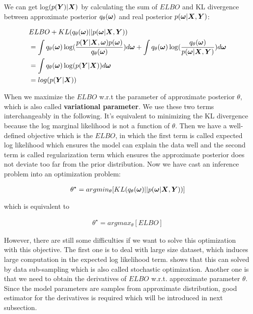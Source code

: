 We can get log$(p(\boldsymbol Y) | \boldsymbol X)$ by calculating the sum of $ELBO$ and KL divergence between approximate posterior $q_{\theta}(\boldsymbol \omega)$ and real posterior $p(\boldsymbol \omega | \boldsymbol X, \boldsymbol Y)$:

\begin{equation}\label{2.7}	
\begin{aligned}
 & ELBO + KL(q_{\theta}(\boldsymbol{\omega}) || p(\boldsymbol{\omega}|\boldsymbol{X}, \boldsymbol{Y})) \\ 
 & = \int q_{\theta}(\boldsymbol{\omega}) \log( \frac{p(\boldsymbol{Y}| \boldsymbol{X}, \boldsymbol{\omega}) p(\boldsymbol{\omega})}{q_{\theta}(\boldsymbol{\omega})}) d\boldsymbol{\omega} + \int q_{\theta}(\boldsymbol{\omega}) \log(\frac{q_{\theta}(\boldsymbol{\omega})}{p(\boldsymbol{\omega}|\boldsymbol{X}, \boldsymbol{Y})}) d\boldsymbol{\omega} \\
 & = \int q_{\theta}(\boldsymbol{\omega}) \log(p(\boldsymbol{Y} | \boldsymbol{X}))d\boldsymbol{\omega}\\
 & = log(p(\boldsymbol{Y}|\boldsymbol{X})) 
\end{aligned}
\end{equation}

When we maximize the $ELBO$ w.r.t the parameter of approximate posterior $\theta$, which is also called \textbf{variational parameter}. We use these two terms interchangeably in the following. It's equivalent to minimizing the KL divergence because the log marginal likelihood is not a function of $\theta$. Then we have a well-defined objective which is the $ELBO$, in which the first term is called expected log likelihood which ensures the model can explain the data well and the second term is called regularization term which ensures the approximate posterior does not deviate too far from the prior distribution.
Now we have cast an inference problem into an optimization problem:

\begin{equation}\label{2.8}	
\begin{aligned}
\theta^{\star} = argmin_{\theta} [KL(q_{\theta}(\boldsymbol \omega)||p(\boldsymbol \omega | \boldsymbol X, \boldsymbol Y))]
\end{aligned}
\end{equation}

which is equivalent to 

\begin{equation}\label{2.9}	
\begin{aligned}
\theta^{\star} = argmax_{\theta} [ELBO]
\end{aligned}
\end{equation}

However, there are still some difficulties if we want to solve this optimization with this objective. The first one is to deal with large size dataset, which induces large computation in the expected log likelihood term. \cite{graves2011practical} shows that this can solved by data sub-sampling which is also called stochastic optimization. Another one is that we need to obtain the derivatives of $ELBO$ w.r.t. approximate parameter $\theta$. Since the model parameters are samples from approximate distribution, good estimator for the derivatives is required which will be introduced in next subsection. 


